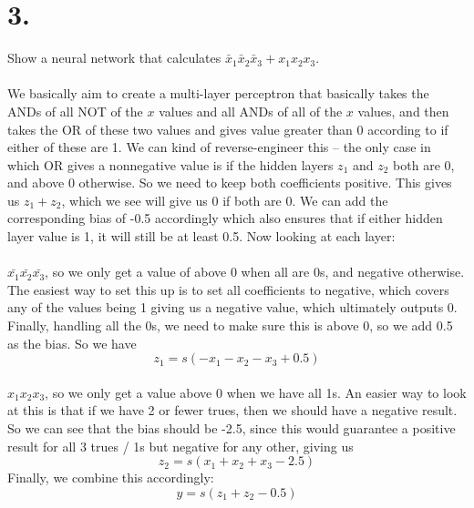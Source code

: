 \documentclass{article}
\begin{document}
{\Large 

\section*{3.}
Show a neural network that calculates \(\bar{x}_1 \bar{x}_2 \bar{x}_3 + x_1 x_2 x_3\). \\ \\
We basically aim to create a multi-layer perceptron that basically takes the ANDs of all NOT of the \(x\) values and all ANDs of all of the \(x\) values, and then takes the OR of these two values and gives value greater than 0 according to if either of these are 1. We can kind of reverse-engineer this -- the only case in which OR gives a nonnegative value is if the hidden layers \(z_1\) and \(z_2\) both are 0, and above 0 otherwise. So we need to keep both coefficients positive. This gives us \(z_1 + z_2\), which we see will give us 0 if both are 0. We can add the corresponding bias of -0.5 accordingly which also ensures that if either hidden layer value is 1, it will still be at least 0.5. Now looking at each layer: \\ \\
\(\bar{x_1} \bar{x_2} \bar{x_3}\), so we only get a value of above 0 when all are 0s, and negative otherwise. The easiest way to set this up is to set all coefficients to negative, which covers any of the values being 1 giving us a negative value, which ultimately outputs 0. Finally, handling all the 0s, we need to make sure this is above 0, so we add 0.5 as the bias. So we have 
\[
  \boxed{z_1 = s(-x_1 - x_2 - x_3 + 0.5)}
\] \\
\(x_1 x_2 x_3\), so we only get a value above 0 when we have all 1s. An easier way to look at this is that if we have 2 or fewer trues, then we should have a negative result. So we can see that the bias should be -2.5, since this would guarantee a positive result for all 3 trues / 1s but negative for any other, giving us 
\[
  \boxed{z_2 = s(x_1 + x_2 + x_3 - 2.5)}
\]
Finally, we combine this accordingly:
\[
  \boxed{y = s(z_1 + z_2 - 0.5)}
\]

}
\end{document}
